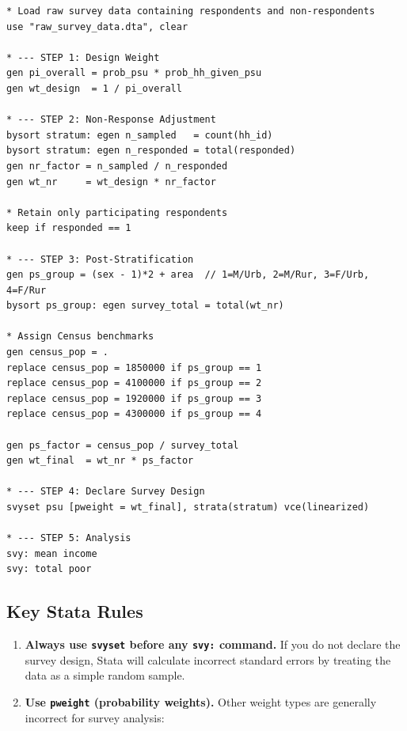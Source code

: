 \documentclass[11pt,a4paper]{article}
\begin{document}
\begin{lstlisting}[style=stata, caption={Complete Stata Weighting Pipeline}]
* Load raw survey data containing respondents and non-respondents
use "raw_survey_data.dta", clear

* --- STEP 1: Design Weight
gen pi_overall = prob_psu * prob_hh_given_psu
gen wt_design  = 1 / pi_overall

* --- STEP 2: Non-Response Adjustment
bysort stratum: egen n_sampled   = count(hh_id)
bysort stratum: egen n_responded = total(responded)
gen nr_factor = n_sampled / n_responded
gen wt_nr     = wt_design * nr_factor

* Retain only participating respondents
keep if responded == 1

* --- STEP 3: Post-Stratification
gen ps_group = (sex - 1)*2 + area  // 1=M/Urb, 2=M/Rur, 3=F/Urb, 4=F/Rur
bysort ps_group: egen survey_total = total(wt_nr)

* Assign Census benchmarks
gen census_pop = .
replace census_pop = 1850000 if ps_group == 1
replace census_pop = 4100000 if ps_group == 2
replace census_pop = 1920000 if ps_group == 3
replace census_pop = 4300000 if ps_group == 4

gen ps_factor = census_pop / survey_total
gen wt_final  = wt_nr * ps_factor

* --- STEP 4: Declare Survey Design
svyset psu [pweight = wt_final], strata(stratum) vce(linearized)

* --- STEP 5: Analysis
svy: mean income
svy: total poor
\end{lstlisting}

\subsection{Key Stata Rules}
\begin{enumerate}
  \item \textbf{Always use \texttt{svyset} before any \texttt{svy:} command.} If you do not declare the survey design, Stata will calculate incorrect standard errors by treating the data as a simple random sample.
  \item \textbf{Use \texttt{pweight} (probability weights).} Other weight types are generally incorrect for survey analysis:
\end{enumerate}
\end{document}
